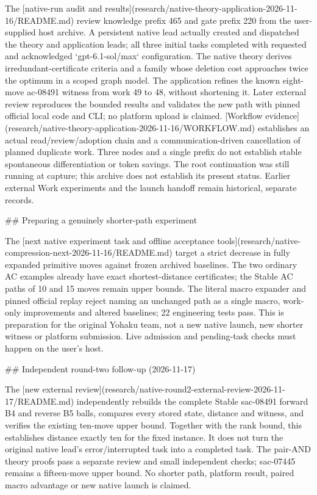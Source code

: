 The [native-run audit and results](research/native-theory-application-2026-11-16/README.md) review knowledge prefix 465 and gate prefix 220 from the user-supplied host archive. A persistent native lead actually created and dispatched the theory and application leads; all three initial tasks completed with requested and acknowledged `gpt-6.1-sol/max` configuration. The native theory derives irredundant-certificate criteria and a family whose deletion cost approaches twice the optimum in a scoped graph model. The application refines the known eight-move ac-08491 witness from work 49 to 48, without shortening it. Later external review reproduces the bounded results and validates the new path with pinned official local code and CLI; no platform upload is claimed. [Workflow evidence](research/native-theory-application-2026-11-16/WORKFLOW.md) establishes an actual read/review/adoption chain and a communication-driven cancellation of planned duplicate work. Three nodes and a single prefix do not establish stable spontaneous differentiation or token savings. The root continuation was still running at capture; this archive does not establish its present status. Earlier external Work experiments and the launch handoff remain historical, separate records.

## Preparing a genuinely shorter-path experiment

The [next native experiment task and offline acceptance tools](research/native-compression-next-2026-11-16/README.md) target a strict decrease in fully expanded primitive moves against frozen archived baselines. The two ordinary AC examples already have exact shortest-distance certificates; the Stable AC paths of 10 and 15 moves remain upper bounds. The literal macro expander and pinned official replay reject naming an unchanged path as a single macro, work-only improvements and altered baselines; 22 engineering tests pass. This is preparation for the original Yohaku team, not a new native launch, new shorter witness or platform submission. Live admission and pending-task checks must happen on the user's host.

## Independent round-two follow-up (2026-11-17)

The [new external review](research/native-round2-external-review-2026-11-17/README.md) independently rebuilds the complete Stable sac-08491 forward B4 and reverse B5 balls, compares every stored state, distance and witness, and verifies the existing ten-move upper bound. Together with the rank bound, this establishes distance exactly ten for the fixed instance. It does not turn the original native lead's error/interrupted task into a completed task. The pair-AND theory proofs pass a separate review and small independent checks; sac-07445 remains a fifteen-move upper bound. No shorter path, platform result, paired macro advantage or new native launch is claimed.

